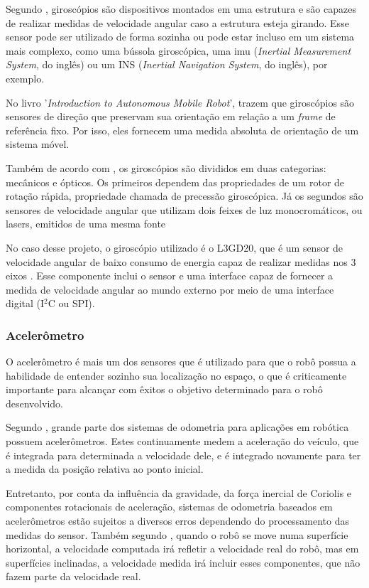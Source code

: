 \documentclass[acronym, symbols, table]{fei}
\begin{document}
				Segundo \textcite{s17102284}, giroscópios são dispositivos montados em uma estrutura e são capazes de realizar medidas de velocidade angular caso a estrutura esteja girando. Esse sensor pode ser utilizado de forma sozinha ou pode estar incluso em um sistema mais complexo, como uma bússola giroscópica, uma \acrshort{imu} (\textit{Inertial Measurement System}, do inglês) ou um INS (\textit{Inertial Navigation System}, do inglês), por exemplo.
				
				No livro '\textit{Introduction to Autonomous Mobile Robot}', \textcite{siegwart2011introduction} trazem que giroscópios são sensores de direção que preservam sua orientação em relação a um \textit{frame} de referência fixo. Por isso, eles fornecem uma medida absoluta de orientação de um sistema móvel. 
				
				Também de acordo com \textcite{siegwart2011introduction}, os giroscópios são divididos em duas categorias: mecânicos e ópticos. Os primeiros dependem das propriedades de um rotor de rotação rápida, propriedade chamada de precessão giroscópica. Já os segundos são sensores de velocidade angular que utilizam dois feixes de luz monocromáticos, ou lasers, emitidos de uma mesma fonte
				
				No caso desse projeto, o giroscópio utilizado é o L3GD20, que é um sensor de velocidade angular de baixo consumo de energia capaz de realizar medidas nos 3 eixos \cite{datasheet_gyro}. Esse componente inclui o sensor e uma interface capaz de fornecer a medida de velocidade angular ao mundo externo por meio de uma interface digital (I$^2$C ou SPI).
			
			\subsubsection{Acelerômetro}
			
				O acelerômetro é mais um dos sensores que é utilizado para que o robô possua a habilidade de entender sozinho sua localização no espaço, o que é criticamente importante para alcançar com êxitos o objetivo determinado para o robô desenvolvido.
			
				Segundo \textcite{NISTLER2011413}, grande parte dos sistemas de odometria para aplicações em robótica possuem acelerômetros. Estes continuamente medem a aceleração do veículo, que é integrada para determinada a velocidade dele, e é integrado novamente para ter a medida da posição relativa ao ponto inicial.
				
				Entretanto, por conta da influência da gravidade, da força inercial de Coriolis \cite{persson1998we} e componentes rotacionais de aceleração, sistemas de odometria baseados em acelerômetros estão sujeitos a diversos erros dependendo do processamento das medidas do sensor. Também segundo \textcite{NISTLER2011413}, quando o robô se move numa superfície horizontal, a velocidade computada irá refletir a velocidade real do robô, mas em superfícies inclinadas, a velocidade medida irá incluir esses componentes, que não fazem parte da velocidade real.
			
\end{document}
